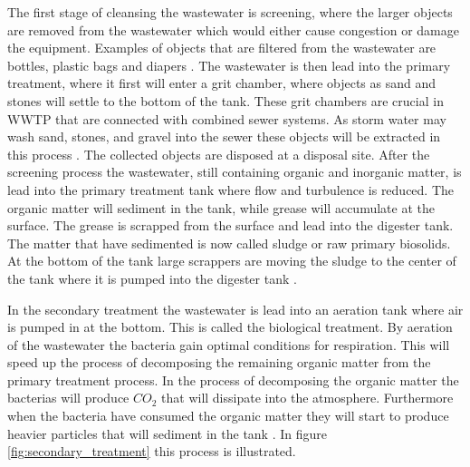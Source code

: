 The first stage of cleansing the wastewater is screening, where the larger objects are removed from the wastewater which would either cause congestion or damage the equipment. Examples of objects that are filtered from the wastewater are bottles, plastic bags and diapers \cite{wwtp_process}. %
The wastewater is then lead into the primary treatment, where it first will enter a grit chamber, where objects as sand and stones will settle to the bottom of the tank. These grit chambers are crucial in WWTP that are connected with combined sewer systems.%
As storm water may wash sand, stones, and gravel into the sewer these objects will be extracted in this process \cite{epa_wwtp}. The collected objects are disposed at a disposal site. 
After the screening process the wastewater, still containing organic and inorganic matter, is lead into the primary treatment tank where flow and turbulence is reduced.
The organic matter will sediment in the tank, while grease will accumulate at the surface. 
The grease is scrapped from the surface and lead into the digester tank. The matter that have sedimented is now called sludge or raw primary biosolids. At the bottom of the tank large scrappers are moving the sludge to the center of the tank where it is pumped into the digester tank \cite{epa_wwtp}.%

In the secondary treatment the wastewater is lead into an aeration tank where air is pumped in at the bottom. This is called the biological treatment. By aeration of the wastewater the bacteria gain optimal conditions for respiration. This will speed up the process of decomposing the remaining organic matter from the primary treatment process. In the process of decomposing the organic matter the bacterias will produce $CO_2$ that will dissipate into the atmosphere. Furthermore when the bacteria have consumed the organic matter they will start to produce heavier particles that will sediment in the tank \cite{wwtp_ekstra}. In figure \ref{fig:secondary_treatment} this process is illustrated.



